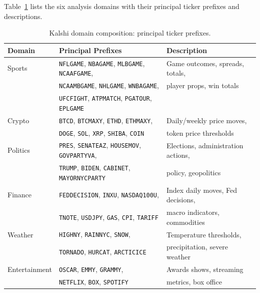 \documentclass[11pt,a4paper]{article}
\begin{document}
\noindent Table~\ref{tab:kalshi_domains} lists the six analysis domains with their principal ticker prefixes and descriptions.

\begin{table}[!ht]
\caption{Kalshi domain composition: principal ticker prefixes.\label{tab:kalshi_domains}}
\begin{tabular*}{\textwidth}{@{\extracolsep{\fill}}lll@{}}
\toprule
Domain & Principal Prefixes & Description \\
\midrule
Sports & \texttt{NFLGAME}, \texttt{NBAGAME}, \texttt{MLBGAME}, \texttt{NCAAFGAME}, & Game outcomes, spreads, totals, \\
       & \texttt{NCAAMBGAME}, \texttt{NHLGAME}, \texttt{WNBAGAME},               & player props, win totals \\
       & \texttt{UFCFIGHT}, \texttt{ATPMATCH}, \texttt{PGATOUR}, \texttt{EPLGAME} & \\[4pt]
Crypto & \texttt{BTCD}, \texttt{BTCMAXY}, \texttt{ETHD}, \texttt{ETHMAXY},       & Daily/weekly price moves, \\
       & \texttt{DOGE}, \texttt{SOL}, \texttt{XRP}, \texttt{SHIBA}, \texttt{COIN} & token price thresholds \\[4pt]
Politics & \texttt{PRES}, \texttt{SENATEAZ}, \texttt{HOUSEMOV}, \texttt{GOVPARTYVA}, & Elections, administration actions, \\
         & \texttt{TRUMP}, \texttt{BIDEN}, \texttt{CABINET}, \texttt{MAYORNYCPARTY}  & policy, geopolitics \\[4pt]
Finance & \texttt{FEDDECISION}, \texttt{INXU}, \texttt{NASDAQ100U},               & Index daily moves, Fed decisions, \\
        & \texttt{TNOTE}, \texttt{USDJPY}, \texttt{GAS}, \texttt{CPI}, \texttt{TARIFF} & macro indicators, commodities \\[4pt]
Weather & \texttt{HIGHNY}, \texttt{RAINNYC}, \texttt{SNOW},                        & Temperature thresholds, \\
        & \texttt{TORNADO}, \texttt{HURCAT}, \texttt{ARCTICICE}                    & precipitation, severe weather \\[4pt]
Entertainment & \texttt{OSCAR}, \texttt{EMMY}, \texttt{GRAMMY},                    & Awards shows, streaming \\
              & \texttt{NETFLIX}, \texttt{BOX}, \texttt{SPOTIFY}                   & metrics, box office \\
\bottomrule
\end{tabular*}
\end{table}
\end{document}
